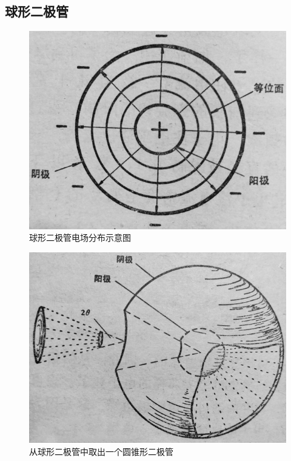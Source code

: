\subsection{球形二极管}

\begin{figure}[phtb]
	\centering
	\includegraphics[width=0.42\linewidth]{figure/ch6-4}
	\caption{球形二极管电场分布示意图}
	\label{ch6-4}
\end{figure}

\begin{figure}[phtb]
	\centering
	\includegraphics[width=0.5\linewidth]{figure/ch6-5}
	\caption{从球形二极管中取出一个圆锥形二极管}
	\label{ch6-5}
\end{figure}

